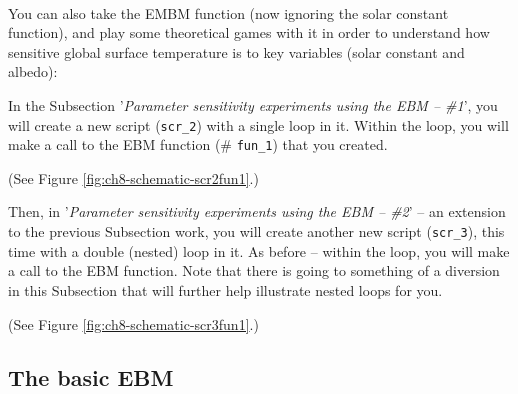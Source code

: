\documentclass{tufte-book} %
\begin{document}
 \\\noindent You can also take the EMBM function (now ignoring the solar constant function), and play some theoretical games with it in order to understand how sensitive global surface temperature is to key variables (solar constant and albedo):

\begin{description}[align=right]

\setlength{\itemindent}{-0.2in}

\item [2.1.5] In the Subsection '\textit{Parameter sensitivity experiments using the EBM -- \#1}', you will create a new script (\texttt{scr\_2}) with a single loop in it. Within the loop, you will make a call to the EBM function (\# \texttt{fun\_1}) that you created.

\noindent (See Figure \ref{fig:ch8-schematic-scr2fun1}.)

\item [2.1.6] Then, in '\textit{Parameter sensitivity experiments using the EBM -- \#2}' -- an extension to the previous Subsection work, you will create another new script (\texttt{scr\_3}), this time  with a double (nested) loop in it. As before -- within the loop, you will make a call to the EBM function.
Note that there is going to something of a diversion in this Subsection that will further help illustrate nested loops for you.

\noindent (See Figure \ref{fig:ch8-schematic-scr3fun1}.)

\end{description}


\newpage

\subsection{The basic EBM}
\end{document}
